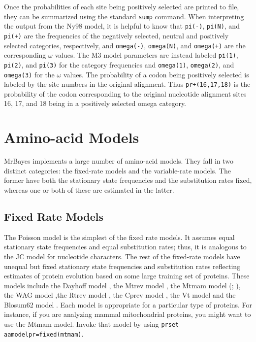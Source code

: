 \documentclass[12pt]{book}
\begin{document}
Once the probabilities of each site being positively selected are printed to file, they can be
summarized using the standard \texttt{sump} command. When interpreting the output from the Ny98
model, it is helpful to know that \texttt{pi(-)}, \texttt{pi(N)}, and \texttt{pi(+)} are the
frequencies of the negatively selected, neutral and positively selected categories, respectively,
and \texttt{omega(-)}, \texttt{omega(N)}, and \texttt{omega(+)} are the corresponding $\omega$
values. The M3 model parameters are instead labeled \texttt{pi(1)}, \texttt{pi(2)}, and
\texttt{pi(3)} for the category frequencies and \texttt{omega(1)}, \texttt{omega(2)}, and
\texttt{omega(3)} for the $\omega$ values. The probability of a codon being positively selected is
labeled by the site numbers in the original alignment. Thus \texttt{pr+(16,17,18)} is the
probability of the codon corresponding to the original nucleotide alignment sites 16, 17, and 18
being in a positively selected omega category.

\section{Amino-acid Models}
\label{amino-acidModels}

MrBayes implements a large number of amino-acid models. They fall in two distinct categories: the
fixed-rate models and the variable-rate models. The former have both the stationary state
frequencies and the substitution rates fixed, whereas one or both of these are estimated in the
latter.

\subsection{Fixed Rate Models}

The Poisson model \citep{bishop87} is the simplest of the fixed rate models. It assumes equal
stationary state frequencies and equal substitution rates; thus, it is analogous to the JC model
for nucleotide characters. The rest of the fixed-rate models have unequal but fixed stationary
state frequencies and substitution rates reflecting estimates of protein evolution based on some
large training set of proteins. These models include the Dayhoff model \citep{dayhoff78}, the Mtrev
model \citep{adachi96}, the Mtmam model (\citet{cao98}; \citet{yang98}), the WAG model
\citep{whelan01},the Rtrev model \citep{dimmic02}, the Cprev model \citep{adachi00}, the Vt model
\citep{muller00} and the Blosum62 model \citep{henikoff92}. Each model is appropriate for a
particular type of proteins. For instance, if you are analyzing mammal mitochondrial proteins, you
might want to use the Mtmam model. Invoke that model by using \texttt{prset
aamodelpr=fixed(mtmam)}.
\end{document}
